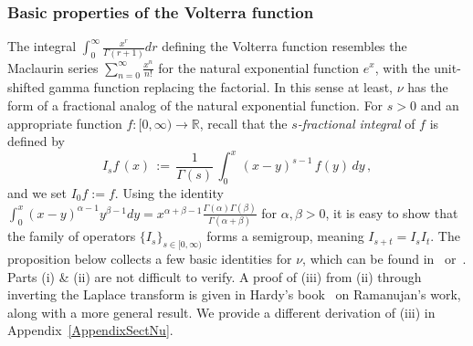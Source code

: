 \documentclass[10pt]{article}
\numberwithin{equation}{section}
\theoremstyle{definition}
\newcommand{\R}{{\mathbb R}}
\begin{document}
\subsubsection{Basic properties of the Volterra function}
 The integral $\int_0^{\infty} \frac{x^r}{\Gamma(r+1) }dr$ defining the Volterra function  resembles  the Maclaurin series $\sum_{n=0}^{\infty}\frac{x^n}{n!} $ for the natural exponential function $e^x$, with the unit-shifted gamma function replacing the factorial.  In this sense at least, $\nu$ has the form of a fractional analog of the natural exponential function.  For $s>0$ and an appropriate function $ f:[0,\infty)\rightarrow \R $,   recall that  the \textit{$s$-fractional integral} of $f$ is defined by
$$I_s f\,(x)\,:=\,\frac{1}{\Gamma(s)}\,\int_0^x\,(x-y)^{s-1}\,f(y)\,dy\,, $$   
and we set $I_0f:=f$. Using the identity $\int_{0}^{x}(x-y)^{\alpha-1}y^{\beta-1}dy=x^{\alpha+\beta-1}\frac{ \Gamma(\alpha)\Gamma(\beta)  }{\Gamma(\alpha+\beta) }   $ for $\alpha,\beta>0$, it is easy to show that the family of operators $\{I_s\}_{s\in [0,\infty)} $ forms a semigroup, meaning  $I_{s+t}=I_sI_t$. 
The proposition below collects a few basic identities for $\nu$, which can be found in~\cite[\S 18.3]{Bateman} or~\cite[Ch.\ 1]{Apelblat}.  Parts (i) \& (ii) are not  difficult to verify.  A proof of (iii) from (ii) through inverting the Laplace transform is given in Hardy's book~\cite[p.\ 196]{Hardy} on Ramanujan's work, along with a more general result.  We provide a different derivation of (iii)  in Appendix~\ref{AppendixSectNu}.
\end{document}
